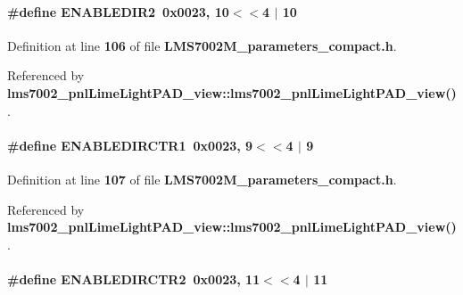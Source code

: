 \paragraph[{E\+N\+A\+B\+L\+E\+D\+I\+R2}]{\setlength{\rightskip}{0pt plus 5cm}\#define E\+N\+A\+B\+L\+E\+D\+I\+R2~0x0023, 10$<$$<$4 $\vert$  10}\label{LMS7002M__parameters__compact_8h_a47e2cc2d5508a20f77fb456327552007}


Definition at line {\bf 106} of file {\bf L\+M\+S7002\+M\+\_\+parameters\+\_\+compact.\+h}.



Referenced by {\bf lms7002\+\_\+pnl\+Lime\+Light\+P\+A\+D\+\_\+view\+::lms7002\+\_\+pnl\+Lime\+Light\+P\+A\+D\+\_\+view()}.

\paragraph[{E\+N\+A\+B\+L\+E\+D\+I\+R\+C\+T\+R1}]{\setlength{\rightskip}{0pt plus 5cm}\#define E\+N\+A\+B\+L\+E\+D\+I\+R\+C\+T\+R1~0x0023, 9$<$$<$4 $\vert$  9}\label{LMS7002M__parameters__compact_8h_ac6f0b84ec51828cfdde429068e87b5ce}


Definition at line {\bf 107} of file {\bf L\+M\+S7002\+M\+\_\+parameters\+\_\+compact.\+h}.



Referenced by {\bf lms7002\+\_\+pnl\+Lime\+Light\+P\+A\+D\+\_\+view\+::lms7002\+\_\+pnl\+Lime\+Light\+P\+A\+D\+\_\+view()}.

\paragraph[{E\+N\+A\+B\+L\+E\+D\+I\+R\+C\+T\+R2}]{\setlength{\rightskip}{0pt plus 5cm}\#define E\+N\+A\+B\+L\+E\+D\+I\+R\+C\+T\+R2~0x0023, 11$<$$<$4 $\vert$  11}\label{LMS7002M__parameters__compact_8h_a85e0a9d9117b150f1a90f5809e525c40}


